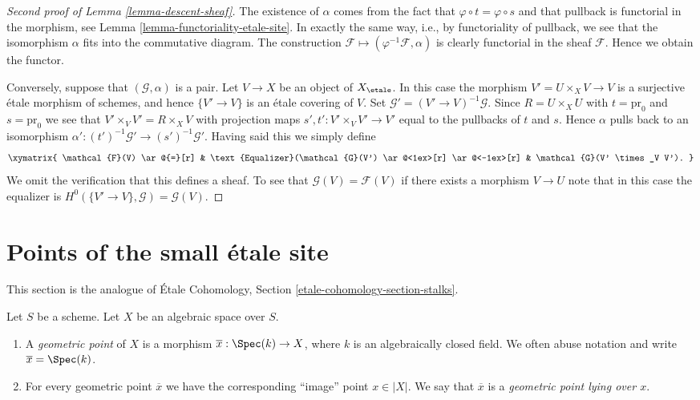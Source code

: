 \begin{proof}[Second proof of Lemma \ref{lemma-descent-sheaf}]
The existence of $\alpha$ comes from the fact that
$\varphi \circ t = \varphi \circ s$ and that pullback is
functorial in the morphism, see
Lemma \ref{lemma-functoriality-etale-site}.
In exactly the same way, i.e., by functoriality of pullback, we see
that the isomorphism $\alpha$ fits into the commutative diagram.
The construction $\mathcal{F} \mapsto (\varphi^{-1}\mathcal{F}, \alpha)$
is clearly functorial in the sheaf $\mathcal{F}$.
Hence we obtain the functor.

\medskip\noindent
Conversely, suppose that $(\mathcal{G}, \alpha)$ is a pair.
Let $V \to X$ be an object of $X_\etale$.
In this case the morphism $V' = U \times_X V \to V$ is a surjective \'etale
morphism of schemes, and hence $\{V' \to V\}$ is an \'etale
covering of $V$. Set $\mathcal{G}' = (V' \to V)^{-1}\mathcal{G}$.
Since $R = U \times_X U$ with $t = \text{pr}_0$
and $s = \text{pr}_0$ we see that $V' \times_V V' = R \times_X V$
with projection maps $s', t' : V' \times_V V' \to V'$ equal to the pullbacks
of $t$ and $s$. Hence $\alpha$ pulls back to an isomorphism
$\alpha' : (t')^{-1}\mathcal{G}' \to (s')^{-1}\mathcal{G}'$. Having said this
we simply define
$$
\xymatrix{
\mathcal{F}(V) \ar@{=}[r] &
\text{Equalizer}(\mathcal{G}(V') \ar@<1ex>[r] \ar@<-1ex>[r] &
\mathcal{G}(V' \times_V V').
}
$$
We omit the verification that this defines a sheaf. To see that
$\mathcal{G}(V) = \mathcal{F}(V)$ if there exists a morphism $V \to U$
note that in this case the equalizer is
$H^0(\{V' \to V\}, \mathcal{G}) = \mathcal{G}(V)$.
\end{proof}







\section{Points of the small \'etale site}
\label{section-points-small-etale-site}

\noindent
This section is the analogue of
\'Etale Cohomology, Section
\ref{etale-cohomology-section-stalks}.

\begin{definition}
\label{definition-geometric-point}
Let $S$ be a scheme. Let $X$ be an algebraic space over $S$.
\begin{enumerate}
\item A {\it geometric point} of $X$ is a morphism
$\overline{x} : \Spec(k) \to X$, where $k$ is an algebraically
closed field. We often abuse notation and
write $\overline{x} = \Spec(k)$.
\item For every geometric point $\overline{x}$ we have the corresponding
``image'' point $x \in |X|$. We say that $\overline{x}$ is a
{\it geometric point lying over $x$}.
\end{enumerate}
\end{definition}


